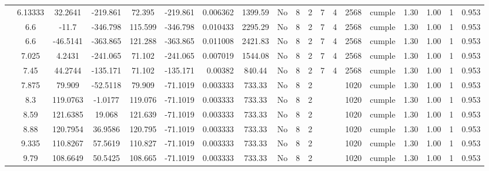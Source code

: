 \begin{table}[H]
{\begin{tabular}{|c|c|c|c|c|c|r|c|c|c|c|c|c|c|c|c|c|c|c|}
\cline{2-19}        & 6.13333 & 32.2641 & -219.861 & 72.395 & -219.861 & 0.006362 & 1399.59 & No  & 8   & 2   & 7   & 4   & 2568 & \cellcolor[rgb]{ .776,  .937,  .808}cumple & 1.30 & 1.00 & 1   & 0.953 \bigstrut\\
\cline{2-19}        & \cellcolor[rgb]{ .851,  .882,  .949}6.6 & -11.7 & -346.798 & 115.599 & -346.798 & 0.010433 & 2295.29 & No  & 8   & 2   & 7   & 4   & 2568 & \cellcolor[rgb]{ .776,  .937,  .808}cumple & 1.30 & 1.00 & 1   & 0.953 \bigstrut\\
\cline{2-19}        & \cellcolor[rgb]{ .851,  .882,  .949}6.6 & -46.5141 & -363.865 & 121.288 & -363.865 & 0.011008 & 2421.83 & No  & 8   & 2   & 7   & 4   & 2568 & \cellcolor[rgb]{ .776,  .937,  .808}cumple & 1.30 & 1.00 & 1   & 0.953 \bigstrut\\
\cline{2-19}        & 7.025 & 4.2431 & -241.065 & 71.102 & -241.065 & 0.007019 & 1544.08 & No  & 8   & 2   & 7   & 4   & 2568 & \cellcolor[rgb]{ .776,  .937,  .808}cumple & 1.30 & 1.00 & 1   & 0.953 \bigstrut\\
\cline{2-19}        & 7.45 & 44.2744 & -135.171 & 71.102 & -135.171 & 0.00382 & 840.44 & No  & 8   & 2   & 7   & 4   & 2568 & \cellcolor[rgb]{ .776,  .937,  .808}cumple & 1.30 & 1.00 & 1   & 0.953 \bigstrut\\
\cline{2-19}        & 7.875 & 79.909 & -52.5118 & 79.909 & -71.1019 & 0.003333 & 733.33 & No  & 8   & 2   &     &     & 1020 & \cellcolor[rgb]{ .776,  .937,  .808}cumple & 1.30 & 1.00 & 1   & 0.953 \bigstrut\\
\cline{2-19}        & 8.3 & 119.0763 & -1.0177 & 119.076 & -71.1019 & 0.003333 & 733.33 & No  & 8   & 2   &     &     & 1020 & \cellcolor[rgb]{ .776,  .937,  .808}cumple & 1.30 & 1.00 & 1   & 0.953 \bigstrut\\
\cline{2-19}        & 8.59 & 121.6385 & 19.068 & 121.639 & -71.1019 & 0.003333 & 733.33 & No  & 8   & 2   &     &     & 1020 & \cellcolor[rgb]{ .776,  .937,  .808}cumple & 1.30 & 1.00 & 1   & 0.953 \bigstrut\\
\cline{2-19}        & 8.88 & 120.7954 & 36.9586 & 120.795 & -71.1019 & 0.003333 & 733.33 & No  & 8   & 2   &     &     & 1020 & \cellcolor[rgb]{ .776,  .937,  .808}cumple & 1.30 & 1.00 & 1   & 0.953 \bigstrut\\
\cline{2-19}        & 9.335 & 110.8267 & 57.5619 & 110.827 & -71.1019 & 0.003333 & 733.33 & No  & 8   & 2   &     &     & 1020 & \cellcolor[rgb]{ .776,  .937,  .808}cumple & 1.30 & 1.00 & 1   & 0.953 \bigstrut\\
\cline{2-19}        & 9.79 & 108.6649 & 50.5425 & 108.665 & -71.1019 & 0.003333 & 733.33 & No  & 8   & 2   &     &     & 1020 & \cellcolor[rgb]{ .776,  .937,  .808}cumple & 1.30 & 1.00 & 1   & 0.953 \bigstrut\\

\end{tabular}}
\end{table}
